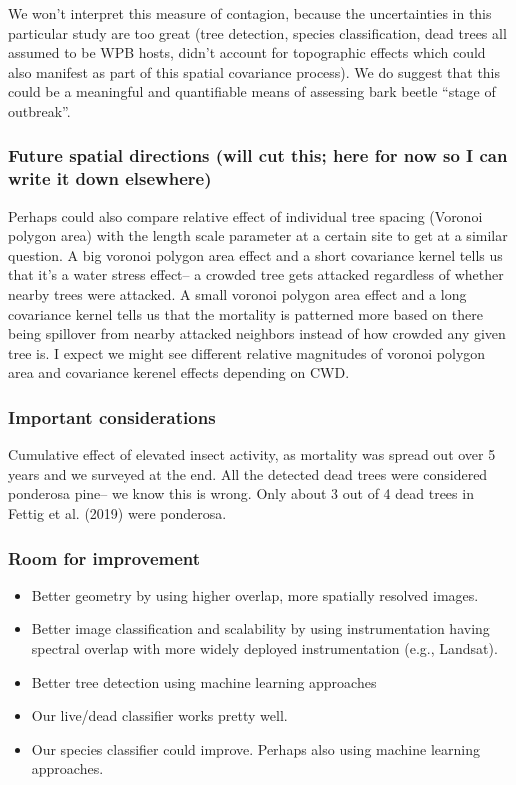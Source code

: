 \documentclass[]{article}
\providecommand{\tightlist}{%
  \setlength{\itemsep}{0pt}\setlength{\parskip}{0pt}}
\begin{document}
We won't interpret this measure of contagion, because the uncertainties
in this particular study are too great (tree detection, species
classification, dead trees all assumed to be WPB hosts, didn't account
for topographic effects which could also manifest as part of this
spatial covariance process). We do suggest that this could be a
meaningful and quantifiable means of assessing bark beetle ``stage of
outbreak''.

\subsubsection{Future spatial directions (will cut this; here for now so
I can write it down
elsewhere)}\label{future-spatial-directions-will-cut-this-here-for-now-so-i-can-write-it-down-elsewhere}

Perhaps could also compare relative effect of individual tree spacing
(Voronoi polygon area) with the length scale parameter at a certain site
to get at a similar question. A big voronoi polygon area effect and a
short covariance kernel tells us that it's a water stress effect-- a
crowded tree gets attacked regardless of whether nearby trees were
attacked. A small voronoi polygon area effect and a long covariance
kernel tells us that the mortality is patterned more based on there
being spillover from nearby attacked neighbors instead of how crowded
any given tree is. I expect we might see different relative magnitudes
of voronoi polygon area and covariance kerenel effects depending on CWD.

\subsubsection{Important considerations}\label{important-considerations}

Cumulative effect of elevated insect activity, as mortality was spread
out over 5 years and we surveyed at the end. All the detected dead trees
were considered ponderosa pine-- we know this is wrong. Only about 3 out
of 4 dead trees in Fettig et al. (2019) were ponderosa.

\subsubsection{Room for improvement}\label{room-for-improvement}

\begin{itemize}
\tightlist
\item
  Better geometry by using higher overlap, more spatially resolved
  images.
\item
  Better image classification and scalability by using instrumentation
  having spectral overlap with more widely deployed instrumentation
  (e.g., Landsat).
\item
  Better tree detection using machine learning approaches
\item
  Our live/dead classifier works pretty well.
\item
  Our species classifier could improve. Perhaps also using machine
  learning approaches.
\end{itemize}
\end{document}
